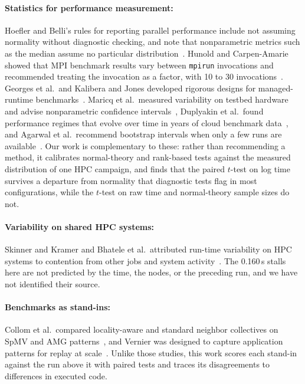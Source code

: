 \documentclass[11pt]{article}
\begin{document}
\paragraph{Statistics for performance measurement:} Hoefler and Belli's rules for
reporting parallel performance include not assuming normality without diagnostic checking,
and note that nonparametric metrics such as the median assume no particular
distribution~\cite{hoefler2015scientific}. Hunold and Carpen-Amarie showed that MPI
benchmark results vary between \texttt{mpirun} invocations and recommended treating the
invocation as a factor, with 10 to 30
invocations~\cite{hunold2016reproducible,hunold2015mpibenchmarking}. Georges et al.\ and
Kalibera and Jones developed rigorous designs for managed-runtime
benchmarks~\cite{georges2007statistically,kalibera2013rigorous}. Maricq et al.\ measured
variability on testbed hardware and advise nonparametric confidence
intervals~\cite{maricq2018taming}, Duplyakin et al.\ found performance regimes that evolve
over time in years of cloud benchmark data~\cite{duplyakin2020datacenter}, and Agarwal et
al.\ recommend bootstrap intervals when only a few runs are available~\cite{agarwal2021deep}.
Our work is complementary to these: rather than recommending a method, it calibrates
normal-theory and rank-based tests against the measured distribution of one HPC campaign,
and finds that the paired $t$-test on log time survives a departure from normality that
diagnostic tests flag in most configurations, while the $t$-test on raw time and
normal-theory sample sizes do not.

\paragraph{Variability on shared HPC systems:} Skinner and Kramer and Bhatele et al.\
attributed run-time variability on HPC systems to contention from other jobs and system
activity~\cite{skinner2005understanding,bhatele2013there}. The 0.160\,s stalls here are
not predicted by the time, the nodes, or the preceding run, and we have not identified
their source.

\paragraph{Benchmarks as stand-ins:} Collom et al.\ compared locality-aware and standard
neighbor collectives on SpMV and AMG patterns~\cite{collom2023}, and Vernier was designed to
capture application patterns for replay at scale~\cite{vernier2025}. Unlike those studies,
this work scores each stand-in against the run above it with paired tests and traces its
disagreements to differences in executed code.
\end{document}
